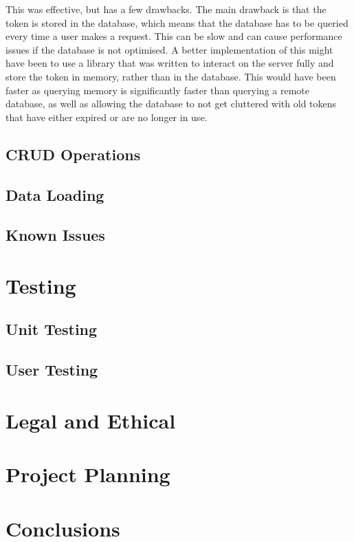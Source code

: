 \documentclass[12pt, a4paper,twoside]{report}
\theoremstyle{plain} %
\theoremstyle{definition} %
\numberwithin{equation}{chapter}
\begin{document}
This was effective, but has a few drawbacks. The main drawback is that the token
is stored in the database, which means that the database has to be queried every
time a user makes a request. This can be slow and can cause performance issues if
the database is not optimised. A better implementation of this might have been to
use a library that was written to interact on the server fully and store the token
in memory, rather than in the database. This would have been faster as querying
memory is significantly faster than querying a remote database, as well as allowing
the database to not get cluttered with old tokens that have either expired or are
no longer in use.

\section{CRUD Operations}\label{sec:crudoperations}

\section{Data Loading}\label{sec:dataloading}

\section{Known Issues}\label{sec:knownissues}

\chapter{Testing}\label{ch:testing}

\section{Unit Testing}\label{sec:unittesting}

\section{User Testing}\label{sec:usertesting}

\chapter{Legal and Ethical}\label{ch:legalandethical}

\chapter{Project Planning}\label{ch:projectplanning}

\chapter{Conclusions}\label{ch:conclusion}



\end{document}
